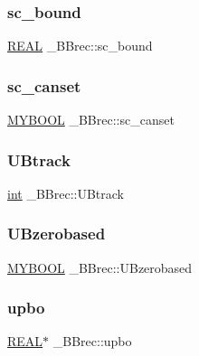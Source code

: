 \subsubsection{\texorpdfstring{sc\+\_\+bound}{sc\_bound}}
{\footnotesize\ttfamily \hyperlink{lp__lib_8h_a92bd5e363d131fa73669358edb232dce}{R\+E\+AL} \+\_\+\+B\+Brec\+::sc\+\_\+bound}

\mbox{\label{struct___b_brec_aaad92855ea7fcac49fe52b2c65c54ed8}} 
\subsubsection{\texorpdfstring{sc\+\_\+canset}{sc\_canset}}
{\footnotesize\ttfamily \hyperlink{lp__lib_8h_aad848328fb3018217ac9f01d97b6bd88}{M\+Y\+B\+O\+OL} \+\_\+\+B\+Brec\+::sc\+\_\+canset}

\mbox{\label{struct___b_brec_a02c54e4dc1c7e72b2f05cdbbf05c9ca4}} 
\subsubsection{\texorpdfstring{U\+Btrack}{UBtrack}}
{\footnotesize\ttfamily \hyperlink{lp__lib_8h_adeb9ec6400320e4923ac9d836d509ddb}{int} \+\_\+\+B\+Brec\+::\+U\+Btrack}

\mbox{\label{struct___b_brec_a20798bbc7df6583baa983a17e5ef0ac6}} 
\subsubsection{\texorpdfstring{U\+Bzerobased}{UBzerobased}}
{\footnotesize\ttfamily \hyperlink{lp__lib_8h_aad848328fb3018217ac9f01d97b6bd88}{M\+Y\+B\+O\+OL} \+\_\+\+B\+Brec\+::\+U\+Bzerobased}

\mbox{\label{struct___b_brec_aff67d6ccb13bd000b958f4293b0115d9}} 
\subsubsection{\texorpdfstring{upbo}{upbo}}
{\footnotesize\ttfamily \hyperlink{lp__lib_8h_a92bd5e363d131fa73669358edb232dce}{R\+E\+AL}$\ast$ \+\_\+\+B\+Brec\+::upbo}

